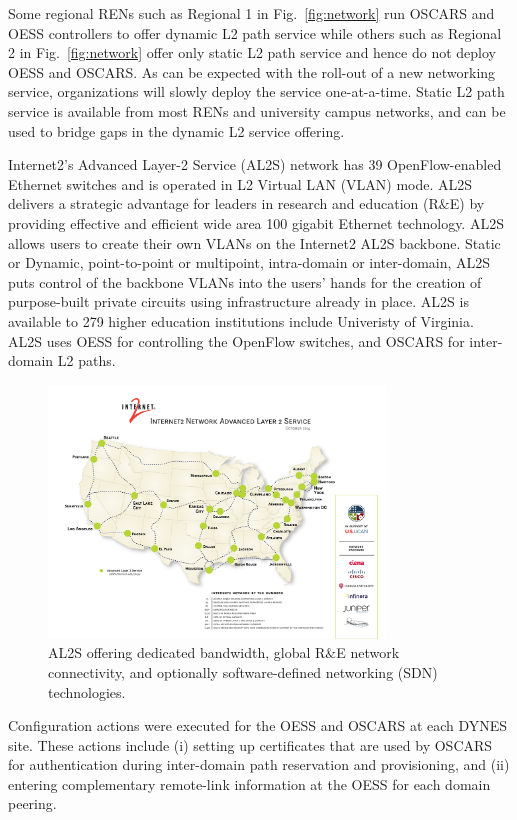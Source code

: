 {Some regional RENs such as Regional 1 in Fig.~\ref{fig:network}
run OSCARS and OESS controllers to offer dynamic
L2 path service while others such as Regional 2 in
Fig.~\ref{fig:network} offer only static L2 path service and
hence do not deploy OESS and OSCARS.
As can be expected with the roll-out of a new networking
service, organizations will slowly deploy the service
one-at-a-time. Static L2 path service is available from most RENs
and university campus networks, and can be used to bridge gaps in the
dynamic L2 service offering.

Internet2's Advanced Layer-2 Service (AL2S) network has 39 OpenFlow-enabled
Ethernet switches and is operated in L2 Virtual LAN (VLAN) mode.
AL2S delivers a strategic advantage for leaders in research and education (R$\&$E) by providing effective and efficient wide area 100 gigabit Ethernet technology. AL2S allows users to create their own VLANs on the Internet2 AL2S backbone. Static or Dynamic, point-to-point or multipoint, intra-domain or inter-domain, AL2S puts control of the backbone VLANs into the users' hands for the creation of purpose-built private circuits using infrastructure already in place. AL2S is available to 279 higher education institutions include Univeristy of Virginia. AL2S uses OESS for controlling the OpenFlow switches, and OSCARS for inter-domain L2 paths.
\begin{figure}[htbp!]
\centering \includegraphics[width=0.80\textwidth]{figures/AL2S.pdf}
\caption{AL2S offering dedicated bandwidth, global R$\&$E network connectivity, and optionally software-defined networking (SDN) technologies.}
\label{fig:AL2S}
\end{figure}


Configuration actions were executed for the OESS and OSCARS at each DYNES site.
These actions include (i) setting up certificates that are used by OSCARS for authentication during inter-domain path reservation and provisioning, and (ii) entering
complementary remote-link information at the OESS for each domain peering.

}
